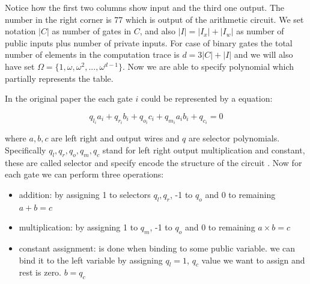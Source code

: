Notice how the first two columns show input and the third one output. The number in the right corner is 77 which is output of the arithmetic circuit. We set notation $|C|$ as number of gates in $C$, and also $|I| = |I_x| + |I_w|$ as number of public inputs plus number of private inputs. For case of binary gates the total number of elements in the computation trace is $d = 3|C| + |I|$ and we will also have set $\Omega = \{1, \omega, \omega^2, ..., \omega^{d-1} \}$. Now we are able to specify polynomial which partially represents the table. 

In the original paper the each gate $i$ could be represented by a equation:

$$q_{l_i} a_i + q_{r_i} b_i+ q_{o_i} c_i + q_{m_i} a_i b_i + q_{c_i} = 0$$

where $a, b, c$ are left right and output wires and $q$ are selector polynomials. Specifically $q_l, q_r, q_o, q_m, q_c$ stand for left right output multiplication and constant, these are called selector and specify encode the structure of the circuit . Now for each gate we can perform three operations:
\begin{itemize}
    \item addition: by assigning 1 to selectors $q_l, q_r$, -1 to $q_o$ and 0 to remaining  
    $a + b = c$
    \item multiplication: by assigning 1 to $q_m$, -1 to $q_o$ and 0 to remaining $a \times b = c$
    \item constant assignment: is done when binding to some public variable. we can bind it to the left variable by assigning $q_l = 1$, $q_c$ value we want to assign and rest is zero. $b = q_c$
\end{itemize}



